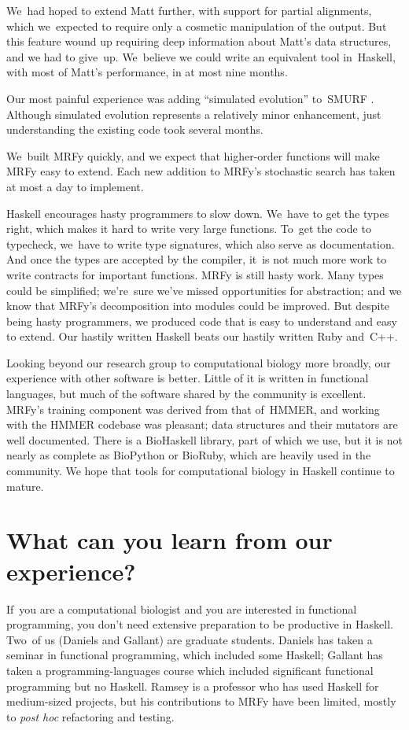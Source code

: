 \documentclass[preprint,nonatbib,blockstyle,times]{sigplanconf}
\let\cite\citep
\begin{document}
We~had hoped to extend Matt further, with support for partial alignments,
which we~expected to require only 
a cosmetic manipulation of the 
output.
But
this feature wound up
requiring deep information about Matt's data structures,
and we had to give~up.
We~believe we could write an equivalent tool in~Haskell,
with most of Matt's performance, in at most nine months.

Our most painful experience was adding ``simulated evolution''
to~SMURF \cite{Daniels:2012}. 
Although simulated evolution represents a relatively minor
enhancement,
just understanding the existing code took several months.

We~built MRFy quickly, and we expect that
higher-order functions will make MRFy easy to extend.
Each new addition to MRFy's stochastic search has taken at most a day
to implement.

Haskell encourages hasty programmers to slow down.
We~have to get the types right,
which makes it hard to write very large functions.
To~get the code to typecheck, we~have to write type signatures, which
also serve as documentation.
And once the types are accepted by the compiler,
it~is not much more work to write contracts for important functions.
MRFy is still hasty work.
Many types could be simplified;
we're~sure we've missed opportunities for abstraction;
and we know that MRFy's decomposition into modules could be improved.
But despite being hasty programmers, we produced code 
that is easy to understand and easy to extend.
Our hastily written Haskell beats
our hastily written Ruby and~C++.


Looking beyond our research group to computational biology more
broadly, our experience with other software is better.
Little of it is written in functional languages, 
but much of the software shared by the community is excellent.
MRFy's training component was derived from that of~HMMER,
and
working with the HMMER 
codebase was pleasant;
data structures and their
mutators are well documented. 
There is a 
BioHaskell library, part of which we use,
but it is not nearly as 
complete as BioPython or BioRuby, which are heavily used in the community.
We hope that tools for computational biology in
Haskell continue to mature. 

\section{What can you learn from our experience?}

If~you are a computational biologist and you are interested in
functional programming, you don't need extensive preparation
to be productive in Haskell.
Two~of us (Daniels and Gallant) are graduate students.
Daniels has taken a seminar in functional programming, which
included some Haskell;
Gallant has taken a programming-languages course which included
significant functional programming but no Haskell.
Ramsey is a professor who has used Haskell 
for medium-sized projects,
but his contributions to MRFy have been limited, mostly to \emph{post hoc}
refactoring and testing.
\end{document}
